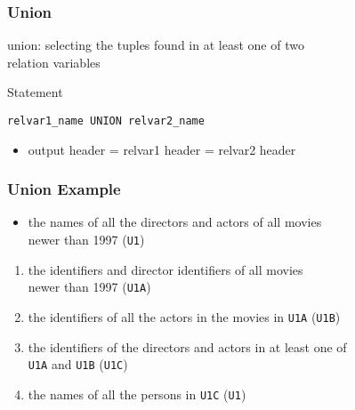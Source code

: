 \documentclass[dvipsnames]{beamer}
\theoremstyle{plain}
\begin{document}
\begin{frame}[fragile]
  \frametitle{Union}

  \begin{definition}
    \alert{union}: selecting the tuples found in at least one of two\\
      relation variables
  \end{definition}

  \pause
  \begin{block}{Statement}
    \begin{lstlisting}
relvar1_name UNION relvar2_name
    \end{lstlisting}
  \end{block}

  \pause
  \begin{itemize}
    \item output header = relvar1 header = relvar2 header
  \end{itemize}
\end{frame}

\begin{frame}
  \frametitle{Union Example}

  \begin{example}
    \begin{itemize}
      \item the names of all the directors and actors of all movies\\
        newer than 1997 (\texttt{U1})
    \end{itemize}

    \pause
    \begin{enumerate}
      \item the identifiers and director identifiers of all movies\\
        newer than 1997 (\texttt{U1A})

      \pause
      \item the identifiers of all the actors in the movies in \texttt{U1A}
        (\texttt{U1B})

      \pause
      \item the identifiers of the directors and actors in at least one of\\
        \texttt{U1A} and \texttt{U1B} (\texttt{U1C})

      \pause
      \item the names of all the persons in \texttt{U1C} (\texttt{U1})
    \end{enumerate}
  \end{example}
\end{frame}
\end{document}
